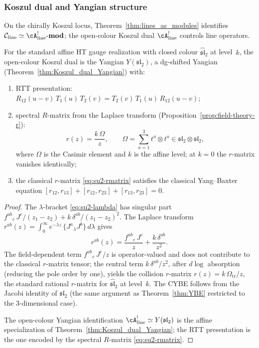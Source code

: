 \subsubsection{Koszul dual and Yangian structure}

On the chirally Koszul locus,
Theorem~\ref{thm:lines_as_modules} identifies
$\mathcal{C}_{\mathrm{line}} \simeq \cA^!_{\mathrm{line}}\text{-}\mathbf{mod}$;
the open-colour Koszul dual $\cA^!_{\mathrm{line}}$ controls line
operators.

\begin{theorem}
\label{thm:su2-yangian}
For the standard affine HT gauge realization with closed colour
$\widehat{\mathfrak{sl}}_2$ at level~$k$, the open-colour Koszul dual is the Yangian
$Y(\mathfrak{sl}_2)$, a dg-shifted Yangian
(Theorem~\ref{thm:Koszul_dual_Yangian}) with:
\begin{enumerate}[label=\textup{(\roman*)}]
\item RTT presentation: $R_{12}(u-v)\, T_1(u)\, T_2(v)
 = T_2(v)\, T_1(u)\, R_{12}(u-v)$;
\item spectral $R$-matrix from the Laplace transform
 (Proposition~\ref{prop:field-theory-r}):
 \begin{equation}\label{eq:su2-rmatrix}
 r(z) = \frac{k\,\Omega}{z},
 \qquad
 \Omega = \sum_{a=1}^3 t^a \otimes t^a
 \in \mathfrak{sl}_2 \otimes \mathfrak{sl}_2,
 \end{equation}
 where $\Omega$ is the Casimir element and $k$ is the affine level; at $k = 0$ the $r$-matrix vanishes identically;
\item the classical $r$-matrix \eqref{eq:su2-rmatrix} satisfies
 the classical Yang--Baxter equation
 $[r_{12}, r_{13}] + [r_{12}, r_{23}] + [r_{13}, r_{23}] = 0$.
\end{enumerate}
\end{theorem}

\begin{proof}
The $\lambda$-bracket \eqref{eq:su2-lambda} has singular part
$f^{ab}{}_c\, J^c / (z_1 - z_2) + k\, \delta^{ab} / (z_1 - z_2)^2$.
The Laplace transform
$r^{ab}(z) = \int_0^\infty e^{-\lambda z}\, \{J^a{}_\lambda J^b\}\, d\lambda$
gives
\[
r^{ab}(z) = \frac{f^{ab}{}_c\, J^c}{z} + \frac{k\, \delta^{ab}}{z^2}.
\]
The field-dependent term $f^{ab}{}_c\, J^c/z$ is operator-valued and
does not contribute to the classical $r$-matrix tensor; the central
term $k\,\delta^{ab}/z^2$, after $d\log$ absorption (reducing the
pole order by one), yields the collision $r$-matrix
$r(z) = k\,\Omega_{\mathrm{tr}}/z$, the standard rational
$r$-matrix for $\widehat{\mathfrak{sl}}_2$ at level~$k$. The CYBE follows from the
Jacobi identity of $\mathfrak{sl}_2$ (the same argument as
Theorem~\ref{thm:YBE} restricted to the $3$-dimensional case).

The open-colour Yangian identification
$\cA^!_{\mathrm{line}} \simeq Y(\mathfrak{sl}_2)$ is the
affine specialization of
Theorem~\ref{thm:Koszul_dual_Yangian}; the RTT presentation is
the one encoded by the spectral $R$-matrix
\eqref{eq:su2-rmatrix}.
\end{proof}


